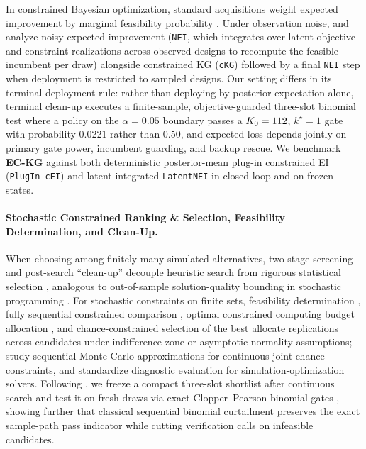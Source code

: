 In constrained Bayesian optimization, standard acquisitions weight expected improvement by marginal feasibility probability \citep{gelbart2014bayesian,gardner2014bayesian,eriksson2021scalable}. Under observation noise, \citet{letham2019constrained} and \citet[Section~5]{ungredda2024bayesian} analyze noisy expected improvement (\texttt{NEI}, which integrates over latent objective and constraint realizations across observed designs to recompute the feasible incumbent per draw) alongside constrained KG (\texttt{cKG}) followed by a final \texttt{NEI} step when deployment is restricted to sampled designs. Our setting differs in its terminal deployment rule: rather than deploying by posterior expectation alone, terminal clean-up executes a finite-sample, objective-guarded three-slot binomial test where a policy on the $\alpha = 0.05$ boundary passes a $K_0 = 112$, $k^\star = 1$ gate with probability $0.0221$ rather than $0.50$, and expected loss depends jointly on primary gate power, incumbent guarding, and backup rescue. We benchmark \textbf{EC-KG} against both deterministic posterior-mean plug-in constrained EI (\texttt{PlugIn-cEI}) and latent-integrated \texttt{LatentNEI} in closed loop and on frozen states.

\paragraph{Stochastic Constrained Ranking \& Selection, Feasibility Determination, and Clean-Up.}
When choosing among finitely many simulated alternatives, two-stage screening and post-search ``clean-up'' decouple heuristic search from rigorous statistical selection \citep{koenig1985procedure,nelson2001simple,boesel2003using}, analogous to out-of-sample solution-quality bounding in stochastic programming \citep{mak1999monte,bayraksan2006assessing}. For stochastic constraints on finite sets, feasibility determination \citep{szechtman2008feasibility,batur2010finding}, fully sequential constrained comparison \citep{andradottir2010fully,healey2014selection}, optimal constrained computing budget allocation \citep[\texttt{OCBA-CO} and \texttt{SCORE};][]{lee2012approximate,hunter2013optimal,pasupathy2015stochastically}, and chance-constrained selection of the best \citep{hong2015chance} allocate replications across candidates under indifference-zone or asymptotic normality assumptions; \citet{hong2011sequential} study sequential Monte Carlo approximations for continuous joint chance constraints, and \citet{eckman2023diagnostic} standardize diagnostic evaluation for simulation-optimization solvers. Following \citet{boesel2003using}, we freeze a compact three-slot shortlist after continuous search and test it on fresh draws via exact Clopper--Pearson binomial gates \citep{clopper1934use}, showing further that classical sequential binomial curtailment \citep{wald1945sequential,batur2010finding} preserves the exact sample-path pass indicator while cutting verification calls on infeasible candidates.

